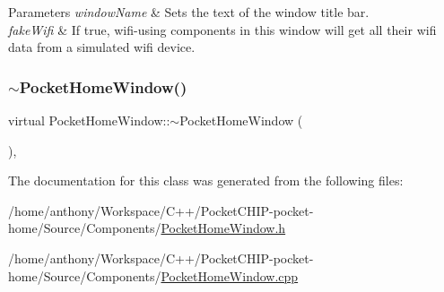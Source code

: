 \begin{DoxyParams}{Parameters}
{\em window\+Name} & Sets the text of the window title bar.\\
\hline
{\em fake\+Wifi} & If true, wifi-\/using components in this window will get all their wifi data from a simulated wifi device. \\
\hline
\end{DoxyParams}
\mbox{\label{classPocketHomeWindow_a861fd19e657471db01b7886d14e2b8d4}} 
\subsubsection{\texorpdfstring{$\sim$\+Pocket\+Home\+Window()}{~PocketHomeWindow()}}
{\footnotesize\ttfamily virtual Pocket\+Home\+Window\+::$\sim$\+Pocket\+Home\+Window (\begin{DoxyParamCaption}{ }\end{DoxyParamCaption})\hspace{0.3cm}{\ttfamily [inline]}, {\ttfamily [virtual]}}



The documentation for this class was generated from the following files\+:\begin{DoxyCompactItemize}
\item 
/home/anthony/\+Workspace/\+C++/\+Pocket\+C\+H\+I\+P-\/pocket-\/home/\+Source/\+Components/\mbox{\hyperlink{PocketHomeWindow_8h}{Pocket\+Home\+Window.\+h}}\item 
/home/anthony/\+Workspace/\+C++/\+Pocket\+C\+H\+I\+P-\/pocket-\/home/\+Source/\+Components/\mbox{\hyperlink{PocketHomeWindow_8cpp}{Pocket\+Home\+Window.\+cpp}}\end{DoxyCompactItemize}
